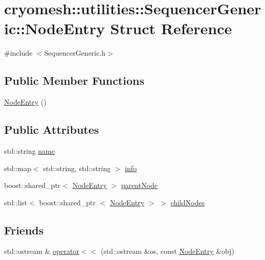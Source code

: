 \hypertarget{structcryomesh_1_1utilities_1_1SequencerGeneric_1_1NodeEntry}{\section{cryomesh\-:\-:utilities\-:\-:\-Sequencer\-Generic\-:\-:\-Node\-Entry \-Struct \-Reference}
\label{structcryomesh_1_1utilities_1_1SequencerGeneric_1_1NodeEntry}
}


{\ttfamily \#include $<$\-Sequencer\-Generic.\-h$>$}

\subsection*{\-Public \-Member \-Functions}
\begin{DoxyCompactItemize}
\item 
\hyperlink{structcryomesh_1_1utilities_1_1SequencerGeneric_1_1NodeEntry_a09783531f959f6f240446bf9247affd7}{\-Node\-Entry} ()
\end{DoxyCompactItemize}
\subsection*{\-Public \-Attributes}
\begin{DoxyCompactItemize}
\item 
std\-::string \hyperlink{structcryomesh_1_1utilities_1_1SequencerGeneric_1_1NodeEntry_ac7bdacc33badb83a8599ac90a94b25aa}{name}
\item 
std\-::map$<$ std\-::string, \*
std\-::string $>$ \hyperlink{structcryomesh_1_1utilities_1_1SequencerGeneric_1_1NodeEntry_a902d9ca7a5864a758bae3e9eb9de711a}{info}
\item 
boost\-::shared\-\_\-ptr$<$ \hyperlink{structcryomesh_1_1utilities_1_1SequencerGeneric_1_1NodeEntry}{\-Node\-Entry} $>$ \hyperlink{structcryomesh_1_1utilities_1_1SequencerGeneric_1_1NodeEntry_ad243d1b3137d6601cb413a43761ac073}{parent\-Node}
\item 
std\-::list$<$ boost\-::shared\-\_\-ptr\*
$<$ \hyperlink{structcryomesh_1_1utilities_1_1SequencerGeneric_1_1NodeEntry}{\-Node\-Entry} $>$ $>$ \hyperlink{structcryomesh_1_1utilities_1_1SequencerGeneric_1_1NodeEntry_aa81743684d922c5af1dca8c15923d272}{child\-Nodes}
\end{DoxyCompactItemize}
\subsection*{\-Friends}
\begin{DoxyCompactItemize}
\item 
std\-::ostream \& \hyperlink{structcryomesh_1_1utilities_1_1SequencerGeneric_1_1NodeEntry_a0f3acff395102a2a1b89879932088968}{operator$<$$<$} (std\-::ostream \&os, const \hyperlink{structcryomesh_1_1utilities_1_1SequencerGeneric_1_1NodeEntry}{\-Node\-Entry} \&obj)
\end{DoxyCompactItemize}


